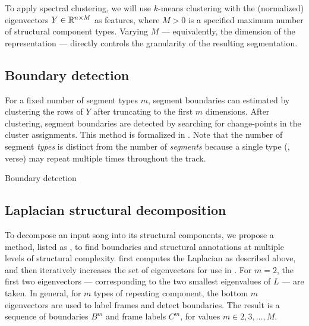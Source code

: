 \documentclass{article}
\begin{document}
To apply spectral clustering, we will use $k$-means clustering with the (normalized) 
eigenvectors $Y \in \mathbb{R}^{n \times M}$ as features, where $M > 0$ is a 
specified maximum number of structural component types.  Varying $M$ --- equivalently, 
the dimension of the representation --- directly controls the granularity of 
the resulting segmentation.


\subsection{Boundary detection}
For a fixed number of segment types $m$, segment boundaries can estimated 
by clustering the rows of $Y$ after truncating to the first $m$ dimensions.
After clustering, segment boundaries are detected by searching for change-points in
the cluster assignments.  This method is formalized in .
Note that the number of segment \emph{types} is distinct from the number of \emph{segments} because a single 
type (\eg, verse) may repeat multiple times throughout the track.

\begin{algorithm}[t]
\caption{Boundary detection}\label{bd}
\begin{algorithmic}[1]
\EndFunction{}
\end{algorithmic}
\end{algorithm}

\subsection{Laplacian structural decomposition}

To decompose an input song into its structural components, we propose a method, listed
as ,
to find boundaries and structural annotations at multiple levels of structural
complexity.   first computes the Laplacian as described above, and
then iteratively increases the set of eigenvectors for use in .  For $m=2$,
the first two eigenvectors --- corresponding to the two smallest eigenvalues of $L$
--- are taken.  In general, for $m$ types of repeating component, the bottom $m$
eigenvectors are used to label frames and detect boundaries.  The result is a sequence
of boundaries $B^m$ and frame labels $C^m$, for values $m \in 2, 3, \dots, M$.
\end{document}
